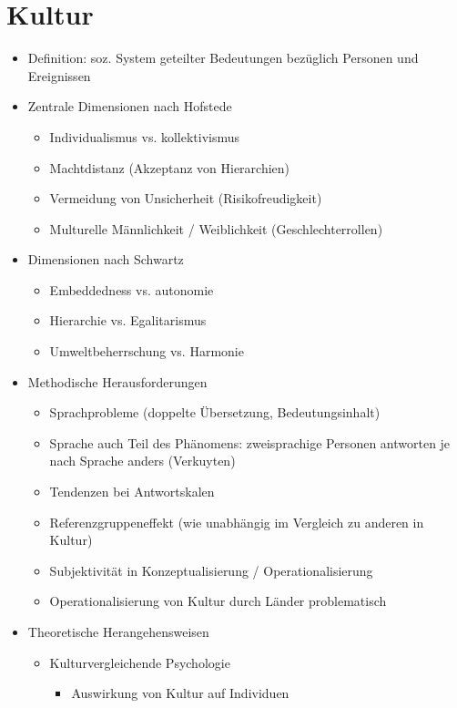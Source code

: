 \documentclass[11pt, paper=a4, twocolumn]{scrartcl}
\begin{document}
	\section{Kultur}
		\begin{itemize}
			\item Definition: soz. System geteilter Bedeutungen bezüglich Personen und Ereignissen
			\item Zentrale Dimensionen nach Hofstede
				\begin{itemize}
					\item Individualismus vs. kollektivismus
					\item Machtdistanz (Akzeptanz von Hierarchien)
					\item Vermeidung von Unsicherheit (Risikofreudigkeit)
					\item Multurelle Männlichkeit / Weiblichkeit (Geschlechterrollen)
				\end{itemize}
			\item Dimensionen nach Schwartz
				\begin{itemize}
					\item Embeddedness vs. autonomie
					\item Hierarchie vs. Egalitarismus
					\item Umweltbeherrschung vs. Harmonie
				\end{itemize}
			\item Methodische Herausforderungen
				\begin{itemize}
					\item Sprachprobleme (doppelte Übersetzung, Bedeutungsinhalt)
					\item Sprache auch Teil des Phänomens: zweisprachige Personen antworten je nach Sprache anders (Verkuyten)
					\item Tendenzen bei Antwortskalen
					\item Referenzgruppeneffekt (wie unabhängig im Vergleich zu anderen in Kultur)
					\item Subjektivität in Konzeptualisierung / Operationalisierung
					\item Operationalisierung von Kultur durch Länder problematisch
				\end{itemize}
			\item Theoretische Herangehensweisen
				\begin{itemize}
					\item Kulturvergleichende Psychologie
						\begin{itemize}
							\item Auswirkung von Kultur auf Individuen

\end{itemize}
\end{itemize}
\end{itemize}
\end{document}
